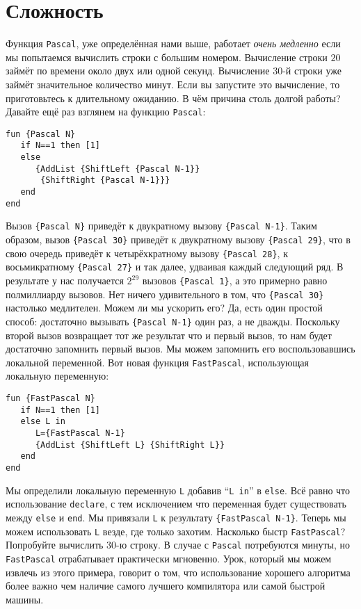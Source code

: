 \section{Сложность}

Функция \lstinline|Pascal|, уже определённая нами выше, работает \emph{очень медленно} если мы попытаемся вычислить строки с большим номером. Вычисление строки $20$ займёт по времени около двух или одной секунд. Вычисление $30$-й строки уже займёт значительное количество минут. Если вы запустите это вычисление, то приготовьтесь к длительному ожиданию. В чём причина столь долгой работы? Давайте ещё раз взглянем на функцию \lstinline|Pascal|:

\begin{lstlisting}
fun {Pascal N}
   if N==1 then [1]
   else
      {AddList {ShiftLeft {Pascal N-1}}
       {ShiftRight {Pascal N-1}}}
   end
end
\end{lstlisting}


Вызов \lstinline|{Pascal N}| приведёт к двукратному вызову \lstinline|{Pascal N-1}|. Таким образом, вызов \lstinline|{Pascal 30}| приведёт к двукратному вызову \lstinline|{Pascal 29}|, что в свою очередь приведёт к четырёхкратному вызову \lstinline|{Pascal 28}|, к восьмикратному \lstinline|{Pascal 27}| и так далее, удваивая каждый следующий ряд. В результате у нас получается $2^{29}$ вызовов \lstinline|{Pascal 1}|, а это примерно равно полмиллиарду вызовов. Нет ничего удивительного в том, что \lstinline|{Pascal 30}| настолько медлителен. Можем ли мы ускорить его? Да, есть один простой способ: достаточно вызывать \lstinline|{Pascal N-1}| один раз, а не дважды. Поскольку второй вызов возвращает тот же результат что и первый вызов, то нам будет достаточно запомнить первый вызов. Мы можем запомнить его воспользовавшись локальной переменной. Вот новая функция \lstinline|FastPascal|, использующая локальную переменную:

\begin{lstlisting}
fun {FastPascal N}
   if N==1 then [1]
   else L in
      L={FastPascal N-1}
      {AddList {ShiftLeft L} {ShiftRight L}}
   end
end
\end{lstlisting}


Мы определили локальную переменную \lstinline|L| добавив ``\lstinline|L in|'' в \lstinline|else|. Всё равно что использование \lstinline|declare|, с тем исключением что переменная будет существовать между \lstinline|else| и \lstinline|end|. Мы привязали \lstinline|L| к результату \lstinline|{FastPascal N-1}|. Теперь мы можем использовать \lstinline|L| везде, где только захотим. Насколько быстр \lstinline|FastPascal|? Попробуйте вычислить $30$-ю строку. В случае с \lstinline|Pascal| потребуются минуты, но \lstinline|FastPascal| отрабатывает практически мгновенно. Урок, который мы можем извлечь из этого примера, говорит о том, что использование хорошего алгоритма более важно чем наличие самого лучшего компилятора или самой быстрой машины.

